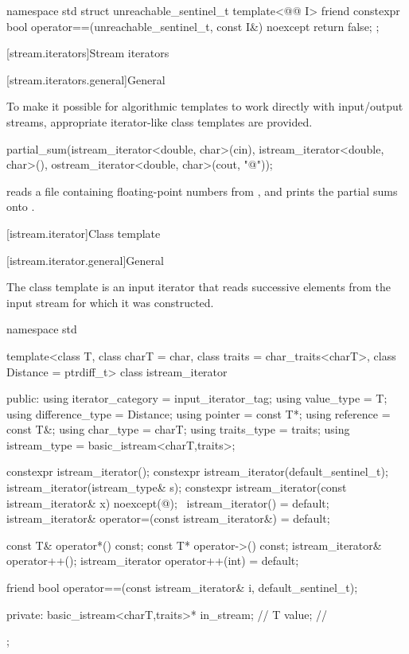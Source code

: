 %
\begin{codeblock}
namespace std {
  struct unreachable_sentinel_t {
    template<@@ I>
      friend constexpr bool operator==(unreachable_sentinel_t, const I&) noexcept
      { return false; }
  };
}
\end{codeblock}

[stream.iterators]{Stream iterators}

[stream.iterators.general]{General}

\pnum
To make it possible for algorithmic templates to work directly with input/output streams, appropriate
iterator-like
class templates
are provided.

\begin{example}
\begin{codeblock}
partial_sum(istream_iterator<double, char>(cin),
  istream_iterator<double, char>(),
  ostream_iterator<double, char>(cout, "@\textbackslash@n"));
\end{codeblock}

reads a file containing floating-point numbers from
,
and prints the partial sums onto
.
\end{example}

[istream.iterator]{Class template }

[istream.iterator.general]{General}

\pnum
{}%
The class template 
is an input iterator that reads successive elements
from the input stream for which it was constructed.

\begin{codeblock}
namespace std {
  template<class T, class charT = char, class traits = char_traits<charT>,
           class Distance = ptrdiff_t>
  class istream_iterator {
  public:
    using iterator_category = input_iterator_tag;
    using value_type        = T;
    using difference_type   = Distance;
    using pointer           = const T*;
    using reference         = const T&;
    using char_type         = charT;
    using traits_type       = traits;
    using istream_type      = basic_istream<charT,traits>;

    constexpr istream_iterator();
    constexpr istream_iterator(default_sentinel_t);
    istream_iterator(istream_type& s);
    constexpr istream_iterator(const istream_iterator& x) noexcept(@\seebelow@);
    ~istream_iterator() = default;
    istream_iterator& operator=(const istream_iterator&) = default;

    const T& operator*() const;
    const T* operator->() const;
    istream_iterator& operator++();
    istream_iterator  operator++(int) = default;

    friend bool operator==(const istream_iterator& i, default_sentinel_t);

  private:
    basic_istream<charT,traits>* in_stream; // \expos
    T value;                                // \expos
  };
}
\end{codeblock}

